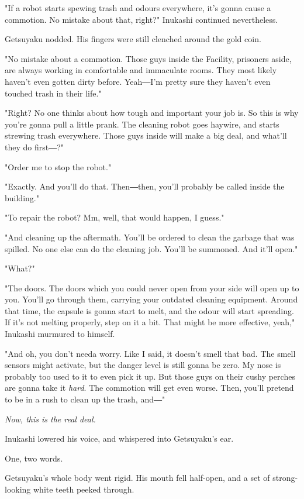 "If a robot starts spewing trash and odours everywhere, it's gonna cause
a commotion. No mistake about that, right?" Inukashi continued
nevertheless.

Getsuyaku nodded. His fingers were still clenched around the gold coin.

"No mistake about a commotion. Those guys inside the Facility, prisoners
aside, are always working in comfortable and immaculate rooms. They most
likely haven't even gotten dirty before. Yeah―I'm pretty sure they
haven't even touched trash in their life."

"Right? No one thinks about how tough and important your job is. So this
is why you're gonna pull a little prank. The cleaning robot goes
haywire, and starts strewing trash everywhere. Those guys inside will
make a big deal, and what'll they do first―?"

"Order me to stop the robot."

"Exactly. And you'll do that. Then―then, you'll probably be called
inside the building."

"To repair the robot? Mm, well, that would happen, I guess."

"And cleaning up the aftermath. You'll be ordered to clean the garbage
that was spilled. No one else can do the cleaning job. You'll be
summoned. And it'll open."

"What?"

"The doors. The doors which you could never open from your side will
open up to you. You'll go through them, carrying your outdated cleaning
equipment. Around that time, the capsule is gonna start to melt, and the
odour will start spreading. If it's not melting properly, step on it a
bit. That might be more effective, yeah," Inukashi murmured to himself.

"And oh, you don't needa worry. Like I said, it doesn't smell that bad.
The smell sensors might activate, but the danger level is still gonna be
zero. My nose is probably too used to it to even pick it up. But those
guys on their cushy perches are gonna take it \emph{hard}. The commotion will
get even worse. Then, you'll pretend to be in a rush to clean up the
trash, and―"

\emph{Now, this is the real deal.}

Inukashi lowered his voice, and whispered into Getsuyaku's ear.

One, two words.

Getsuyaku's whole body went rigid. His mouth fell half-open, and a set
of strong-looking white teeth peeked through.

